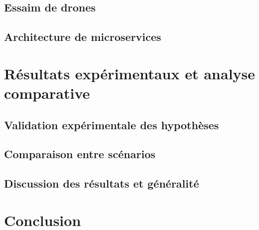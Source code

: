 

\section{Essaim de drones}



\section{Architecture de microservices}



\chapter{Résultats expérimentaux et analyse comparative}
\section{Validation expérimentale des hypothèses}
\section{Comparaison entre scénarios}
\section{Discussion des résultats et généralité}

\chapter*{Conclusion}
